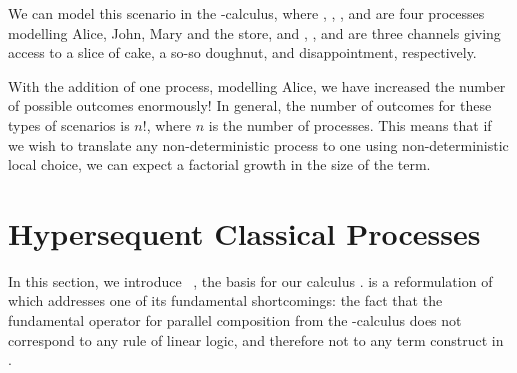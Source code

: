 \documentclass[UKenglish]{llncs}
\begin{document}
We can model this scenario in the \textpi-calculus, where \alice, \john,
\mary, and \store are four processes modelling Alice, John, Mary and the store,
and \sliceofcake, \doughnut, and \nope are three channels giving access to a
slice of cake, a so-so doughnut, and disappointment, respectively.
\begin{center}
\end{center}
With the addition of one process, modelling Alice, we have increased the number
of possible outcomes enormously! In general, the number of outcomes for these
types of scenarios is $n!$, where $n$ is the number of processes. This means
that if we wish to translate any non-deterministic process to one using
non-deterministic local choice, we can expect a factorial growth in the size of
the term.

\section{Hypersequent Classical Processes}\label{sec:cp-revisited}
In this section, we introduce \dhcp~\parencite{kokke2018tlla,kokke2019pacmpl}, the basis for our calculus \nodcap. \dhcp is a reformulation of \cp which addresses one of its fundamental shortcomings: the fact that the fundamental operator for parallel composition from the \textpi-calculus does not correspond to any rule of linear logic, and therefore not to any term construct in \cp.
\end{document}

